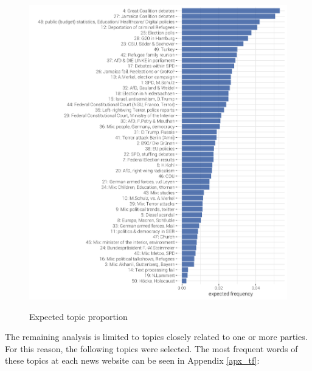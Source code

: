 \documentclass[12pt,a4paper,notitlepage]{article}
\begin{document}
\begin{figure}[H]
	\begin{center}
	\caption{Expected topic proportion}
		\includegraphics[width=\textwidth,keepaspectratio]{../figs/topic_proportion.png}
		\label{fig_topic_proportion}
\end{center}
\end{figure}

The remaining analysis is limited to topics closely related to one or more parties. For this reason, the following topics were selected. The most frequent words of these topics at each news website can be seen in Appendix \ref{apx_tf}: 
\end{document}
